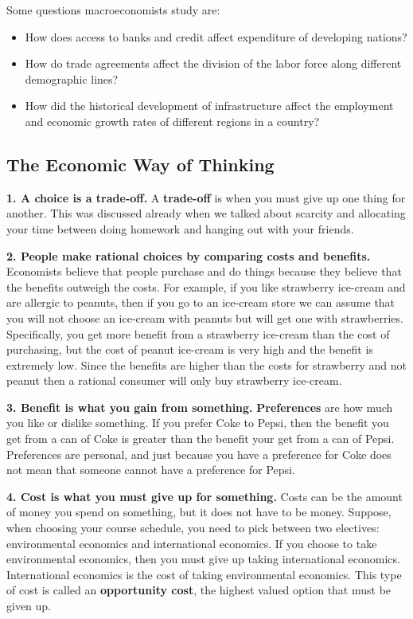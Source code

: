 \documentclass[
]{book}
\providecommand{\tightlist}{%
  \setlength{\itemsep}{0pt}\setlength{\parskip}{0pt}}
\begin{document}
Some questions macroeconomists study are:

\begin{itemize}
\tightlist
\item
  How does access to banks and credit affect expenditure of developing nations?
\item
  How do trade agreements affect the division of the labor force along different demographic lines?
\item
  How did the historical development of infrastructure affect the employment and economic growth rates of different regions in a country?
\end{itemize}

\subsection{The Economic Way of Thinking}\label{the-economic-way-of-thinking}

\textbf{1. A choice is a trade-off.}
A \textbf{trade-off} is when you must give up one thing for another. This was discussed already when we talked about scarcity and allocating your time between doing homework and hanging out with your friends.

\textbf{2. People make rational choices by comparing costs and benefits.}
Economists believe that people purchase and do things because they believe that the benefits outweigh the costs. For example, if you like strawberry ice-cream and are allergic to peanuts, then if you go to an ice-cream store we can assume that you will not choose an ice-cream with peanuts but will get one with strawberries. Specifically, you get more benefit from a strawberry ice-cream than the cost of purchasing, but the cost of peanut ice-cream is very high and the benefit is extremely low. Since the benefits are higher than the costs for strawberry and not peanut then a rational consumer will only buy strawberry ice-cream.

\textbf{3. Benefit is what you gain from something.}
\textbf{Preferences} are how much you like or dislike something. If you prefer Coke to Pepsi, then the benefit you get from a can of Coke is greater than the benefit your get from a can of Pepsi. Preferences are personal, and just because you have a preference for Coke does not mean that someone cannot have a preference for Pepsi.

\textbf{4. Cost is what you must give up for something.}
Costs can be the amount of money you spend on something, but it does not have to be money. Suppose, when choosing your course schedule, you need to pick between two electives: environmental economics and international economics. If you choose to take environmental economics, then you must give up taking international economics. International economics is the cost of taking environmental economics. This type of cost is called an \textbf{opportunity cost}, the highest valued option that must be given up.
\end{document}
